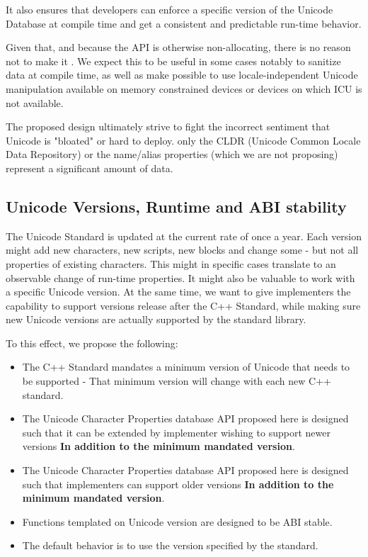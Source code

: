 \documentclass{wg21}
\begin{document}
It also ensures that developers can enforce a specific version of the Unicode Database at compile time and get a
consistent and predictable run-time behavior.

Given that, and because the API is otherwise non-allocating, there is no reason not to make it .
We expect this to be useful in some cases notably to sanitize data at compile time, as well as make possible to use
locale-independent Unicode manipulation available on memory constrained devices or devices on which ICU is not available.

The proposed design ultimately strive to fight the incorrect sentiment that Unicode is "bloated" or hard to deploy.
only the CLDR (Unicode Common Locale Data Repository) or the name/alias properties (which we are not proposing) represent
a significant amount of data.


\subsection{Unicode Versions, Runtime and ABI stability}

The Unicode Standard is updated at the current rate of once a year.
Each version might add new characters, new scripts, new blocks and change some - but not all
properties of existing characters.
This might in specific cases translate to an observable change of run-time properties.
It might also be valuable to work with a specific Unicode version.
At the same time, we want to give implementers the capability to support versions release after the C++ Standard,
while making sure new Unicode versions are actually supported by the standard library.

To this effect, we propose the following:

\begin{itemize}
    \item The C++ Standard mandates a minimum version of Unicode that needs to be supported - That minimum version will change with each new C++ standard.
    \item The Unicode Character Properties database API proposed here is designed such that it can be extended by implementer wishing to support newer versions \textbf{In addition to the minimum mandated version}.
    \item The Unicode Character Properties database API proposed here is designed such that implementers can support older versions \textbf{In addition to the minimum mandated version}.
    \item Functions templated on Unicode version are designed to be ABI stable.
    \item The default behavior is to use the version specified by the standard.
\end{itemize}
\end{document}
